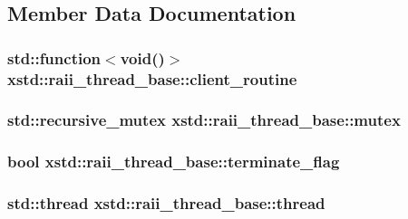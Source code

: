 \subsection{Member Data Documentation}
\hypertarget{classxstd_1_1raii__thread__base_a6b3e160c7eb131008410a16c460b03ff}{
\subsubsection[{client\-\_\-routine}]{\setlength{\rightskip}{0pt plus 5cm}std\-::function$<$void()$>$ xstd\-::raii\-\_\-thread\-\_\-base\-::client\-\_\-routine\hspace{0.3cm}{\ttfamily [protected]}}}\label{classxstd_1_1raii__thread__base_a6b3e160c7eb131008410a16c460b03ff}
\hypertarget{classxstd_1_1raii__thread__base_a9d9e01fced1a4f58ea5a9cc165f54fe3}{
\subsubsection[{mutex}]{\setlength{\rightskip}{0pt plus 5cm}std\-::recursive\-\_\-mutex xstd\-::raii\-\_\-thread\-\_\-base\-::mutex\hspace{0.3cm}{\ttfamily [protected]}}}\label{classxstd_1_1raii__thread__base_a9d9e01fced1a4f58ea5a9cc165f54fe3}
\hypertarget{classxstd_1_1raii__thread__base_aaac3bfb5572d71de17cb71d7ed0bb15c}{
\subsubsection[{terminate\-\_\-flag}]{\setlength{\rightskip}{0pt plus 5cm}bool xstd\-::raii\-\_\-thread\-\_\-base\-::terminate\-\_\-flag\hspace{0.3cm}{\ttfamily [protected]}}}\label{classxstd_1_1raii__thread__base_aaac3bfb5572d71de17cb71d7ed0bb15c}
\hypertarget{classxstd_1_1raii__thread__base_a664b3c47514557c3047e4ee0d7d9f25f}{
\subsubsection[{thread}]{\setlength{\rightskip}{0pt plus 5cm}std\-::thread xstd\-::raii\-\_\-thread\-\_\-base\-::thread\hspace{0.3cm}{\ttfamily [protected]}}}\label{classxstd_1_1raii__thread__base_a664b3c47514557c3047e4ee0d7d9f25f}


